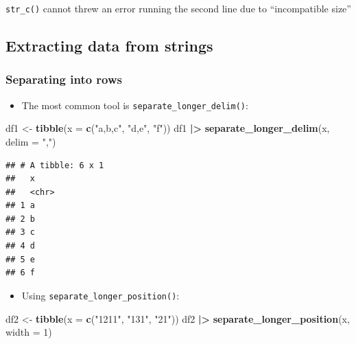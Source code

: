 \documentclass[
]{article}
\newenvironment{Shaded}{\begin{snugshade}}{\end{snugshade}}
\newcommand{\AttributeTok}[1]{\textcolor[rgb]{0.13,0.29,0.53}{#1}}
\newcommand{\DecValTok}[1]{\textcolor[rgb]{0.00,0.00,0.81}{#1}}
\newcommand{\FunctionTok}[1]{\textcolor[rgb]{0.13,0.29,0.53}{\textbf{#1}}}
\newcommand{\NormalTok}[1]{#1}
\newcommand{\OtherTok}[1]{\textcolor[rgb]{0.56,0.35,0.01}{#1}}
\newcommand{\SpecialCharTok}[1]{\textcolor[rgb]{0.81,0.36,0.00}{\textbf{#1}}}
\newcommand{\StringTok}[1]{\textcolor[rgb]{0.31,0.60,0.02}{#1}}
\providecommand{\tightlist}{%
  \setlength{\itemsep}{0pt}\setlength{\parskip}{0pt}}
\begin{document}
\texttt{str\_c()} cannot threw an error running the second line due to
``incompatible size''

\subsection{Extracting data from
strings}\label{extracting-data-from-strings}

\subsubsection{Separating into rows}\label{separating-into-rows}

\begin{itemize}
\tightlist
\item
  The most common tool is \texttt{separate\_longer\_delim()}:
\end{itemize}

\begin{Shaded}
\begin{Highlighting}[]
\NormalTok{df1 }\OtherTok{\textless{}{-}} \FunctionTok{tibble}\NormalTok{(}\AttributeTok{x =} \FunctionTok{c}\NormalTok{(}\StringTok{"a,b,c"}\NormalTok{, }\StringTok{"d,e"}\NormalTok{, }\StringTok{"f"}\NormalTok{))}
\NormalTok{df1 }\SpecialCharTok{|\textgreater{}} 
  \FunctionTok{separate\_longer\_delim}\NormalTok{(x, }\AttributeTok{delim =} \StringTok{","}\NormalTok{)}
\end{Highlighting}
\end{Shaded}

\begin{verbatim}
## # A tibble: 6 x 1
##   x    
##   <chr>
## 1 a    
## 2 b    
## 3 c    
## 4 d    
## 5 e    
## 6 f
\end{verbatim}

\begin{itemize}
\tightlist
\item
  Using \texttt{separate\_longer\_position()}:
\end{itemize}

\begin{Shaded}
\begin{Highlighting}[]
\NormalTok{df2 }\OtherTok{\textless{}{-}} \FunctionTok{tibble}\NormalTok{(}\AttributeTok{x =} \FunctionTok{c}\NormalTok{(}\StringTok{"1211"}\NormalTok{, }\StringTok{"131"}\NormalTok{, }\StringTok{"21"}\NormalTok{))}
\NormalTok{df2 }\SpecialCharTok{|\textgreater{}} 
  \FunctionTok{separate\_longer\_position}\NormalTok{(x, }\AttributeTok{width =} \DecValTok{1}\NormalTok{)}
\end{Highlighting}
\end{Shaded}
\end{document}

